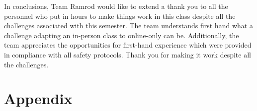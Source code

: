 \documentclass[conf]{new-aiaa}
\begin{document}
In conclusions, Team Ramrod would like to extend a thank you to all the personnel who put in hours to make things work in this class despite all the challenges associated with this semester. The team understands first hand what a challenge adapting an in-person class to online-only can be. Additionally, the team appreciates the opportunities for first-hand experience which were provided in compliance with all safety protocols. Thank you for making it work despite all the challenges.

\clearpage

\FloatBarrier

\section{Appendix}


\end{document}
